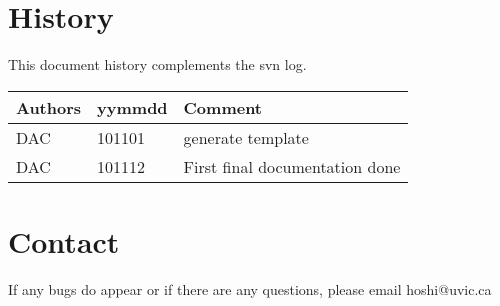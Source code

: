 \section{History} 
This document history complements the svn log.

\begin{tabular*}{\textwidth}{lll}
\hline
Authors & yymmdd & Comment \\
\hline
DAC & 101101 & generate template \\
DAC & 101112 & First final documentation done \\
\hline
\end{tabular*}


\section{Contact}
If any bugs do appear or if there are any questions, please email hoshi@uvic.ca
\begin{verbatim}

\end{verbatim}


%
%
%
%
